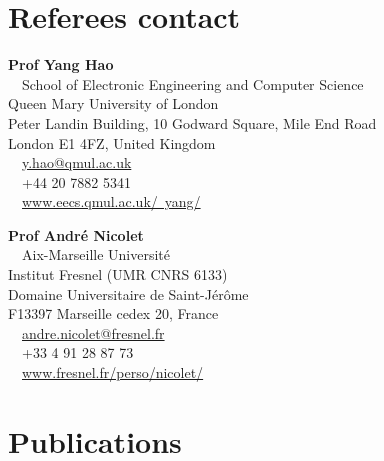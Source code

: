 \documentclass{cv}
\begin{document}
\section{Referees contact}

\begin{minipage}{.6\textwidth}
	\textbf{Prof Yang Hao}\\
	\faHome~~School of Electronic Engineering and Computer Science\\
	Queen Mary University of London\\
	Peter Landin Building, 10 Godward Square, Mile End Road\\
	London E1 4FZ, United Kingdom\\
	\faEnvelope~~\href{mailto:y.hao@qmul.ac.uk}{y.hao@qmul.ac.uk}\\
	\faPhone~~+44 20 7882 5341\\
	\faUser~~\href{http://www.eecs.qmul.ac.uk/~yang/}{www.eecs.qmul.ac.uk/~yang/}
\end{minipage}%
\begin{minipage}{0.4\textwidth}
	\textbf{Prof Andr\'e Nicolet}\\
	\faHome~~Aix-Marseille Université\\
	Institut Fresnel (UMR CNRS 6133)\\
	Domaine Universitaire de Saint-Jérôme\\
	F13397 Marseille cedex 20, France\\
	\faEnvelope~~\href{mailto:andre.nicolet@fresnel.fr}{andre.nicolet@fresnel.fr}\\
	\faPhone~~+33 4 91 28 87 73\\
	\faUser~~\href{https://www.fresnel.fr/perso/nicolet/}{www.fresnel.fr/perso/nicolet/}
\end{minipage}


\vspace*{0.5cm}



\section{Publications}







\end{document}
